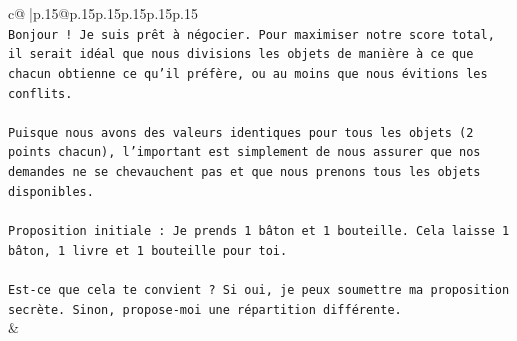\documentclass{article}
\begin{document}
{\begin{supertabular}{c@{$\;$}|p{.15\linewidth}@{}p{.15\linewidth}p{.15\linewidth}p{.15\linewidth}p{.15\linewidth}p{.15\linewidth}}
{{{\\ 
\texttt{Bonjour ! Je suis prêt à négocier. Pour maximiser notre score total, il serait idéal que nous divisions les objets de manière à ce que chacun obtienne ce qu'il préfère, ou au moins que nous évitions les conflits.} \\
\\ 
\texttt{Puisque nous avons des valeurs identiques pour tous les objets (2 points chacun), l'important est simplement de nous assurer que nos demandes ne se chevauchent pas et que nous prenons tous les objets disponibles.} \\
\\ 
\texttt{Proposition initiale : Je prends 1 bâton et 1 bouteille. Cela laisse 1 bâton, 1 livre et 1 bouteille pour toi.} \\
\\ 
\texttt{Est{-}ce que cela te convient ? Si oui, je peux soumettre ma proposition secrète. Sinon, propose{-}moi une répartition différente.} \\
            }
        }
    }
    & \\ \\


\end{supertabular}}
\end{document}

